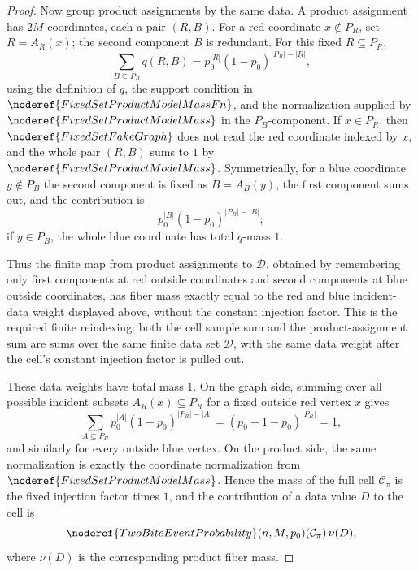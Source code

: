 \begin{proof}
Now group product assignments by the same data.  A product assignment has
\(2M\) coordinates, each a pair \((R,B)\).  For a red coordinate
\(x\notin P_R\), set \(R=A_R(x)\); the second component \(B\) is redundant.
For this fixed \(R\subseteq P_R\),
\[
\sum_{B\subseteq P_B}q(R,B)
=p_0^{|R|}(1-p_0)^{|P_R|-|R|},
\]
using the definition of \(q\), the support condition in
\(\noderef{FixedSetProductModelMassFn}\), and the normalization supplied by
\(\noderef{FixedSetProductModelMass}\) in the \(P_B\)-component.  If
\(x\in P_R\), then \(\noderef{FixedSetFakeGraph}\) does not read the red
coordinate indexed by \(x\), and the whole pair \((R,B)\) sums to \(1\) by
\(\noderef{FixedSetProductModelMass}\).  Symmetrically, for a blue coordinate
\(y\notin P_B\) the second component is fixed as \(B=A_B(y)\), the first
component sums out, and the contribution is
\[
p_0^{|B|}(1-p_0)^{|P_B|-|B|};
\]
if \(y\in P_B\), the whole blue coordinate has total \(q\)-mass \(1\).

Thus the finite map from product assignments to \(\mathcal D\), obtained by
remembering only first components at red outside coordinates and second
components at blue outside coordinates, has fiber mass exactly equal to the
red and blue incident-data weight displayed above, without the constant
injection factor.  This is the required finite reindexing: both the cell
sample sum and the product-assignment sum are sums over the same finite data
set \(\mathcal D\), with the same data weight after the cell's constant
injection factor is pulled out.

These data weights have total mass \(1\).  On the graph side, summing over
all possible incident subsets \(A_R(x)\subseteq P_R\) for a fixed outside red
vertex \(x\) gives
\[
\sum_{A\subseteq P_R}p_0^{|A|}(1-p_0)^{|P_R|-|A|}
=(p_0+1-p_0)^{|P_R|}=1,
\]
and similarly for every outside blue vertex.  On the product side, the same
normalization is exactly the coordinate normalization from
\(\noderef{FixedSetProductModelMass}\).  Hence the mass of the full cell
\(\mathcal C_\pi\) is the fixed injection factor times \(1\), and the
contribution of a data value \(D\) to the cell is
\[
\noderef{TwoBiteEventProbability}(n,M,p_0)(\mathcal C_\pi)\,\nu(D),
\]
where \(\nu(D)\) is the corresponding product fiber mass.


\end{proof}
